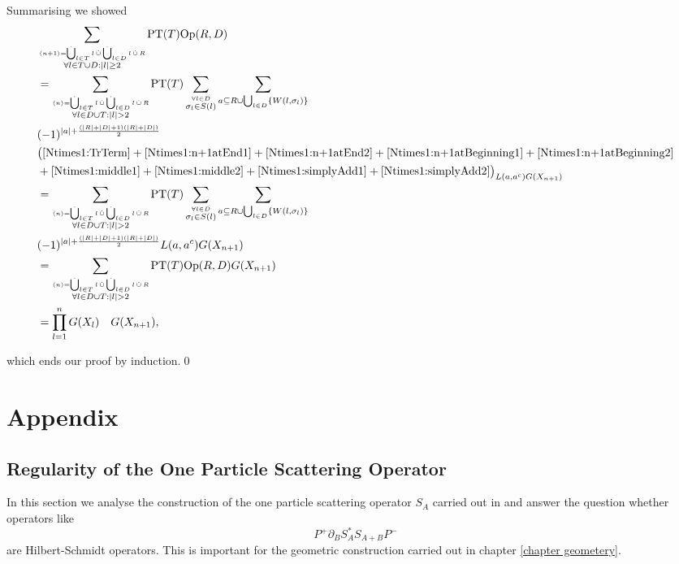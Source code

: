 \documentclass[b5paper,draft,openbib,12pt]{memoir}
\DeclareMathOperator{\dotCup}{\mathop{\dot{\bigcup}}}
\DeclareMathOperator{\dotcup}{\mathop{\dot{\cup}}}
\begin{document}
Summarising we showed 
\begin{align*}
&\sum_{\stackrel{\langle n +1 \rangle = \dotCup_{l\in T} l \dotcup \dotCup_{l\in D} l \dotcup R}{ \forall l \in T \cup D: |l|\ge 2}} \text{PT}(T) \text{Op}(R,D)\\
 &=\sum_{\stackrel{\langle n \rangle = \dotCup_{l\in T}l \dotcup \dotCup_{l\in D} l \dotcup R}{\forall l \in D \cup T: |l|>2} }\text{PT}(T) \sum_{\stackrel{\forall l \in D}{\sigma_l \in S(l)}}  \sum_{a\subseteq R \cup \bigcup_{l\in D}\{W(l,\sigma_l)\}} \\
  & (-1)^{|a|+\frac{(|R|+|D|+1)(|R|+|D|)}{2}}  \\
  &\big( \eqref{Ntimes1:TrTerm}+\eqref{Ntimes1:n+1atEnd1}+\eqref{Ntimes1:n+1atEnd2} 
  +\eqref{Ntimes1:n+1atBeginning1}+\eqref{Ntimes1:n+1atBeginning2}\\
 &+\eqref{Ntimes1:middle1}+\eqref{Ntimes1:middle2}
  +\eqref{Ntimes1:simplyAdd1}+\eqref{Ntimes1:simplyAdd2}\big)_{L(a,a^c) G(X_{n+1})}\\
 &=\sum_{\stackrel{\langle n \rangle = \dotCup_{l\in T}l \dotcup \dotCup_{l\in D} l \dotcup R}{\forall l \in D \cup T: |l|>2} }\text{PT}(T) \sum_{\stackrel{\forall l \in D}{\sigma_l \in S(l)}}  \sum_{a\subseteq R \cup \bigcup_{l\in D}\{W(l,\sigma_l)\}} \\
  & (-1)^{|a|+\frac{(|R|+|D|+1)(|R|+|D|)}{2}} L(a,a^c)G(X_{n+1})\\
  &=\sum_{\stackrel{\langle n \rangle = \dotCup_{l\in T}l \dotcup \dotCup_{l\in D} l \dotcup R}{\forall l \in D \cup T: |l|>2} }\text{PT}(T) \text{Op}(R,D)G(X_{n+1})\\
  &=\prod_{l=1}^n G(X_{l}) \quad G(X_{n+1}),
\end{align*}

which ends our proof by induction.\qed




\appendix

\backmatter

\chapter{Appendix}


\section{Regularity of the One Particle Scattering Operator}\label{chap:regularity of S}
In this section we analyse the construction of the one particle 
scattering operator \(S_A\)
carried out in \cite{ivp0} and answer the question whether
operators like
\begin{equation}
P^+ \partial_B S_{A}^* S_{A+B}P^-
\end{equation}
are Hilbert-Schmidt operators. This is important 
for the geometric construction carried out in 
chapter \ref{chapter geometery}. 
\end{document}
